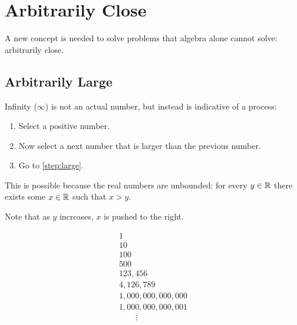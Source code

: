 \documentclass[letterpaper,12pt,fleqn]{article}
\begin{document}
\section*{Arbitrarily Close}

A new concept is needed to solve problems that algebra alone cannot solve: arbitrarily close.

\subsection*{Arbitrarily Large}

Infinity (\(\infty\)) is not an actual number, but instead is indicative of a process:

\begin{enumerate}
\item Select a positive number.
\item\label{step:large} Now select a next number that is larger than the previous number.
\item Go to \ref{step:large}.
\end{enumerate}

This is possible because the real numbers are unbounded: for every \(y\in\mathbb{R}\) there exists some \(x\in\mathbb{R}\) such
that \(x>y\).

\bigskip

\begin{center}
\end{center}

Note that as \(y\) increases, \(x\) is pushed to the right.

\begin{example}
  \[\begin{array}{l}
  1 \\
  10 \\
  100 \\
  500 \\
  123,456 \\
  4,126,789 \\
  1,000,000,000,000 \\
  1,000,000,000,001 \\
  \qquad\vdots
  \end{array}\]
\end{example}
\end{document}
